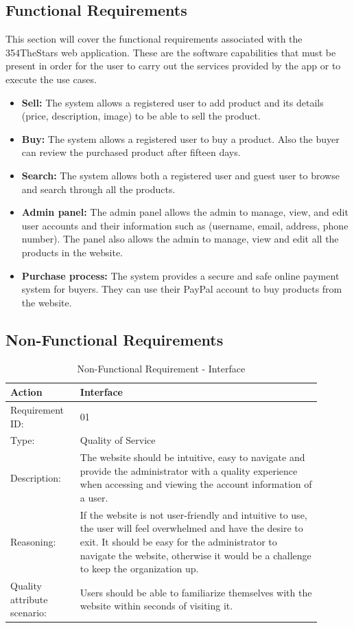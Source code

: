 \documentclass[11pt]{article}
\newcounter{use case ID}
\newcommand\addrow[2]{#1 & #2\\ \hline}
\newcounter{req ID}
\newcommand\tabularheadfsd[1]{
            \begin{table}[ht]
                \addtocounter{req ID}{1}
                \caption{Non-Functional Requirement \arabic{req ID} - #1}
                \vspace{0.2cm}
                \begin{tabular}{|p{0.2\linewidth}|p{0.70\linewidth}|}
                    \hline
                    \textbf{Action} & \textbf{#1} \\
                    \hline}
\newenvironment{requirement}{\tabularheadfsd}
                {\hline\end{tabular}\end{table}}
\begin{document}
\subsection{Functional Requirements} \label{func req}

This section will cover the functional requirements associated with the 354TheStars web application. These are the software capabilities that must be present in order for the user to carry out the services provided by the app or to execute the use cases.

\begin{itemize}
    \item \textbf{Sell:} The system allows a registered user to add product and its details (price, description, image) to be able to sell the product.
    \item \textbf{Buy:} The system allows a registered user to buy a product. Also the buyer can review the purchased product after fifteen days.
    \item  \textbf{Search:} The system allows both a registered user and guest user to browse and search through all the products.
    \item  \textbf{Admin panel:} The admin panel allows the admin to manage, view, and edit user accounts and their information such as (username, email, address, phone number). The panel also allows the admin to manage, view and edit all the products in the website.
    \item \textbf{Purchase process:} The system provides a secure and safe online payment system for buyers. They can use their PayPal account to buy products from the website.
\end{itemize}

\clearpage

\subsection{Non-Functional Requirements}\label{nonfunc req}

\begin{requirement}{Interface}
    \addrow{Requirement ID:}{01}
    \addrow{Type:}{Quality of Service}
    \addrow{Description:}{The website should be intuitive, easy to navigate and provide the \index{administrator}administrator with a quality experience when accessing and viewing the account \index{information}information of a user.}
    \addrow{Reasoning:}{If the website is not user-friendly and intuitive to use, the user will feel overwhelmed and have the desire to exit. It should be easy for the \index{administrator}administrator to navigate the website, otherwise it would be a challenge to keep the organization up.}
    \addrow{Quality attribute scenario:}{Users should be able to familiarize themselves with the website within seconds of visiting it.}
\end{requirement}
\end{document}

